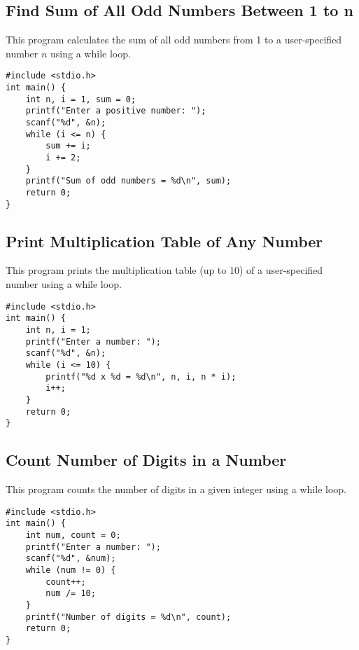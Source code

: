 \documentclass[a4paper,12pt]{article}
\begin{document}
\subsection{Find Sum of All Odd Numbers Between 1 to n}
This program calculates the sum of all odd numbers from 1 to a user-specified number \(n\) using a while loop.

\begin{lstlisting}[caption={Find Sum of All Odd Numbers Between 1 to n}]
#include <stdio.h>
int main() {
    int n, i = 1, sum = 0;
    printf("Enter a positive number: ");
    scanf("%d", &n);
    while (i <= n) {
        sum += i;
        i += 2;
    }
    printf("Sum of odd numbers = %d\n", sum);
    return 0;
}
\end{lstlisting}

\newpage

\subsection{Print Multiplication Table of Any Number}
This program prints the multiplication table (up to 10) of a user-specified number using a while loop.

\begin{lstlisting}[caption={Print Multiplication Table of Any Number}]
#include <stdio.h>
int main() {
    int n, i = 1;
    printf("Enter a number: ");
    scanf("%d", &n);
    while (i <= 10) {
        printf("%d x %d = %d\n", n, i, n * i);
        i++;
    }
    return 0;
}
\end{lstlisting}

\newpage

\subsection{Count Number of Digits in a Number}
This program counts the number of digits in a given integer using a while loop.

\begin{lstlisting}[caption={Count Number of Digits in a Number}]
#include <stdio.h>
int main() {
    int num, count = 0;
    printf("Enter a number: ");
    scanf("%d", &num);
    while (num != 0) {
        count++;
        num /= 10;
    }
    printf("Number of digits = %d\n", count);
    return 0;
}
\end{lstlisting}

\newpage
\end{document}
